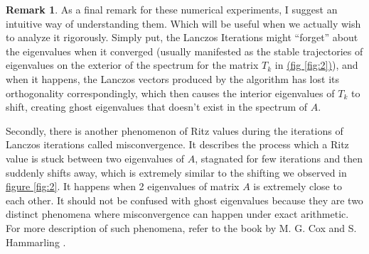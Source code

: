 \documentclass[]{article}
\theoremstyle{definition}
\newtheorem{remark}{Remark}[subsection]  %
\begin{document}
            \begin{remark}
                As a final remark for these numerical experiments, I suggest an intuitive way of understanding them. Which will be useful when we actually wish to analyze it rigorously. Simply put, the Lanczos Iterations might ``forget'' about the eigenvalues when it converged (usually manifested as the stable trajectories of eigenvalues on the exterior of the spectrum for the matrix $T_k$ in \hyperref[fig:2]{(fig \ref*{fig:2})}), and when it happens, the Lanczos vectors produced by the algorithm has lost its orthogonality correspondingly, which then causes the interior eigenvalues of $T_k$ to shift, creating ghost eigenvalues that doesn't exist in the spectrum of $A$. 
                \par
                Secondly, there is another phenomenon of Ritz values during the iterations of Lanczos iterations called misconvergence. It describes the process which a Ritz value is stuck between two eigenvalues of $A$, stagnated for few iterations and then suddenly shifts away, which is extremely similar to the shifting we observed in \hyperref[fig:2]{figure \ref*{fig:2}}. It happens when 2 eigenvalues of matrix $A$ is extremely close to each other. It should not be confused with ghost eigenvalues because they are two distinct phenomena where misconvergence can happen under exact arithmetic. For more description of such phenomena, refer to the book by M. G. Cox and S. Hammarling \cite{book:reliable_computation}. 
            \end{remark}
\end{document}
